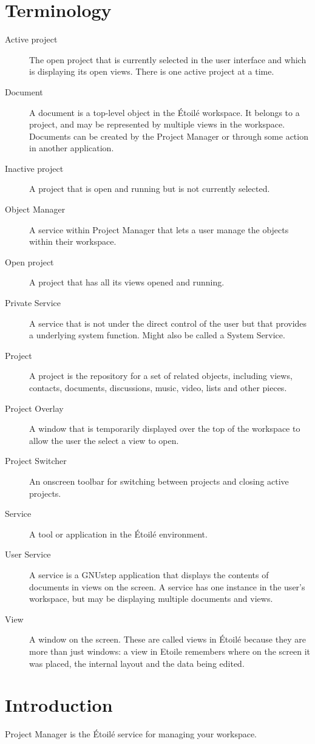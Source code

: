 \documentclass[11pt]{report}
\newcommand{\etoile}{\'Etoil\'e\xspace}
\newcommand{\proman}{Project Manager\xspace}
\begin{document}
\section{Terminology}
\begin{description}
\item[Active project] The open project that is currently selected in the user interface and which is displaying its open views. There is one active project at a time.
\item[Document] A document is a top-level object in the \etoile workspace. It belongs to a project, and may be represented by multiple views in the workspace. Documents can be created by the \proman or through some action in another application.
\item[Inactive project] A project that is open and running but is not currently selected. 
\item[Object Manager] A service within \proman that lets a user manage the objects within their workspace.
\item[Open project] A project that has all its views opened and running.
\item[Private Service] A service that is not under the direct control of the user but that provides a underlying system function. Might also be called a System Service.
\item[Project]  A project is the repository for a set of related objects, including views, contacts, documents, discussions, music, video, lists and other pieces.
\item[Project Overlay] A window that is temporarily displayed over the top of the workspace to allow the user the select a view to open.
\item[Project Switcher] An onscreen toolbar for switching between projects and closing active projects.
\item[Service] A tool or application in the \etoile environment.
\item[User Service] A service is a GNUstep application that displays the contents of documents in views on the screen. A service has one instance in the user's workspace, but may be displaying multiple documents and views.
\item[View] A window on the screen. These are called views in \etoile because they are more than just windows: a view in Etoile remembers where on the screen it was placed, the internal layout and the data being edited.
\end{description}

\section{Introduction}
Project Manager is the \etoile service for managing your workspace.
\end{document}
